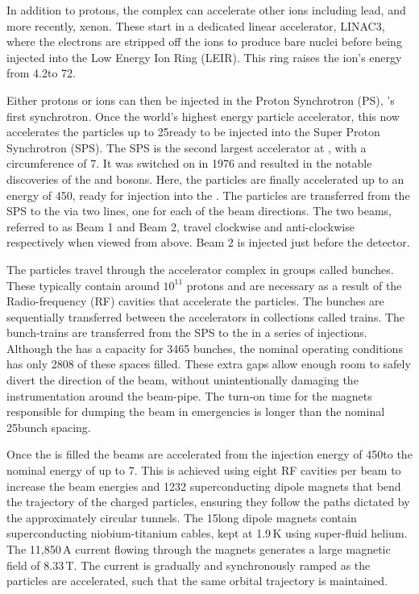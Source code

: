 In addition to protons, the complex can accelerate other ions including lead, and more recently, xenon. These start in a dedicated linear accelerator, LINAC3, where the electrons are stripped off the ions to produce bare nuclei before being injected into the Low Energy Ion Ring (LEIR). This ring raises the ion's energy from 4.2\mev to 72\mev. 

Either protons or ions can then be injected in the Proton Synchrotron (PS), \cern's first synchrotron. Once the world's highest energy particle accelerator, this now accelerates the particles up to 25\gev ready to be injected into the Super Proton Synchrotron (SPS).
The SPS is the second largest accelerator at \cern, with a circumference of 7\km. It was switched on in 1976 and resulted in the notable discoveries of the \W and \Z bosons. Here, the particles are finally accelerated up to an energy of 450\gev, ready for injection into the \lhc. The particles are transferred from the SPS to the \lhc via two lines, one for each of the \lhc beam directions. The two beams, referred to as Beam 1 and Beam 2, travel clockwise and anti-clockwise respectively when viewed from above. Beam 2 is injected just before the \lhcb detector. 

The particles travel through the accelerator complex in groups called bunches. These typically contain around $10^{11}$ protons and are necessary as a result of the Radio-frequency (RF) cavities that accelerate the particles. The bunches are sequentially transferred between the accelerators in collections called trains. The bunch-trains are transferred from the SPS to the \lhc in a series of injections. Although the \lhc has a capacity for 3465 bunches, the nominal operating conditions has only 2808 of these spaces filled. 
These extra gaps allow enough room to safely divert the direction of the beam, without unintentionally damaging the instrumentation around the beam-pipe. The turn-on time for the magnets responsible for dumping the beam in emergencies is longer than the nominal 25\ns bunch spacing. 


Once the \lhc is filled the beams are accelerated from the injection energy of 450\gev to the nominal energy of up to 7\tev. This is achieved using eight RF cavities per beam to increase the beam energies and 1232 superconducting dipole magnets that bend the trajectory of the charged particles, ensuring they follow the paths dictated by the approximately circular tunnels. The 15\m long dipole magnets contain superconducting niobium-titanium cables, kept at 1.9\,K using super-fluid helium. The 11,850\,A current flowing through the magnets generates a large magnetic field of 8.33\,T. The current is gradually and synchronously ramped as the particles are accelerated, such that the same orbital trajectory is maintained. 

